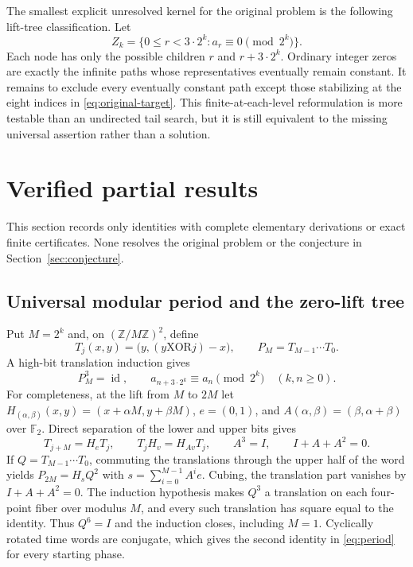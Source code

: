 \documentclass[11pt]{amsart}
\theoremstyle{definition}
\begin{document}
The smallest explicit unresolved kernel for the original problem is the
following lift-tree classification.  Let
\[
 Z_k=\{0\leq r<3\cdot2^k:a_r\equiv0\pmod{2^k}\}.
\]
Each node has only the possible children $r$ and $r+3\cdot2^k$.
Ordinary integer zeros are exactly the infinite paths whose representatives
eventually remain constant.  It remains to exclude every eventually constant
path except those stabilizing at the eight indices in
\eqref{eq:original-target}.  This finite-at-each-level reformulation is more
testable than an undirected tail search, but it is still equivalent to the
missing universal assertion rather than a solution.

\section{Verified partial results}\label{sec:partial}

This section records only identities with complete elementary derivations or
exact finite certificates.  None resolves the original problem or the
conjecture in Section~\ref{sec:conjecture}.

\subsection{Universal modular period and the zero-lift tree}

Put $M=2^k$ and, on $(\mathbb Z/M\mathbb Z)^2$, define
\[
 T_j(x,y)=\bigl(y,(y\mathbin{\mathrm{XOR}}j)-x\bigr),\qquad
 P_M=T_{M-1}\cdots T_0.
\]
A high-bit translation induction gives
\begin{equation}\label{eq:period}
 P_M^3=\operatorname{id},\qquad
 a_{n+3\cdot2^k}\equiv a_n\pmod{2^k}
 \quad(k,n\geq0).
\end{equation}
For completeness, at the lift from $M$ to $2M$ let
$H_{(\alpha,\beta)}(x,y)=(x+\alpha M,y+\beta M)$,
$e=(0,1)$, and $A(\alpha,\beta)=(\beta,\alpha+\beta)$ over
$\mathbb F_2$.  Direct separation of the lower and upper bits gives
\[
 T_{j+M}=H_eT_j,\qquad T_jH_v=H_{Av}T_j,\qquad
 A^3=I,\qquad I+A+A^2=0.
\]
If $Q=T_{M-1}\cdots T_0$, commuting the translations through the upper
half of the word yields $P_{2M}=H_sQ^2$ with
$s=\sum_{i=0}^{M-1}A^ie$.  Cubing, the translation part vanishes by
$I+A+A^2=0$.  The induction hypothesis makes $Q^3$ a translation on each
four-point fiber over modulus $M$, and every such translation has square
equal to the identity.  Thus $Q^6=I$ and the induction closes, including
$M=1$.  Cyclically rotated time words are conjugate, which gives the second
identity in \eqref{eq:period} for every starting phase.
\end{document}
